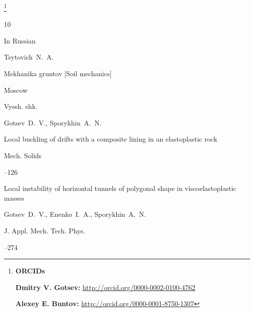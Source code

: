 \thanks{{\bf ORCIDs}



{\bf  Dmitry V. Gotsev:}    \url{http://orcid.org/0000-0002-0100-4762}



{\bf Alexey E. Buntov:}  \url{http://orcid.org/0000-0001-8750-1307}

}





\EngRef



\begin{thebibliography}{10}




\lang In Russian

\by Tsytovich~N.~A.

\book Mekhanika gruntov \rm [Soil mechanics]

\publaddr Moscow

\publ Vyssh. shk.








\by  Gotsev~D.~V.,  Sporykhin~A.~N.

\paper Local buckling of drifts with a composite lining in an elastoplastic rock

\jour Mech. Solids



--126 





\paper Local instability of horizontal tunnels of polygonal shape in viscoelastoplastic masses

\by  Gotsev~D.~V.,  Enenko~I.~A.,  Sporykhin~A.~N.


\jour J. Appl. Mech. Tech. Phys.




–274






\end{thebibliography}

